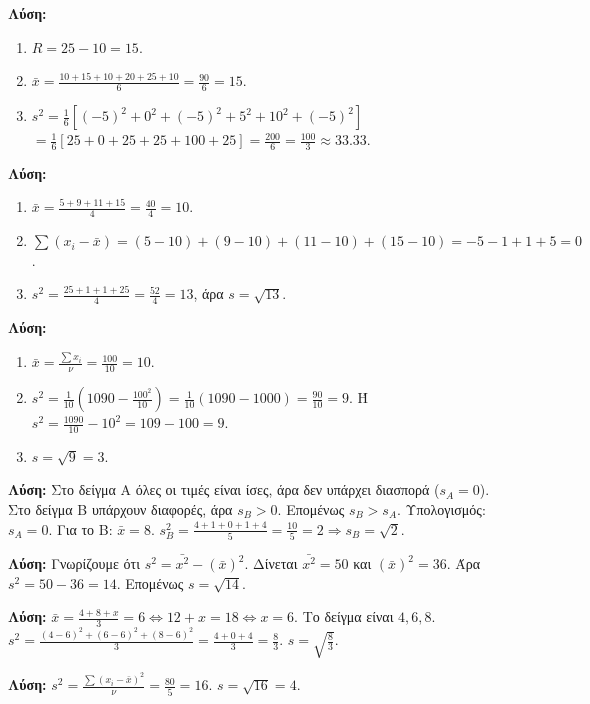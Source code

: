 \documentclass[11pt,a4paper,modern]{FFExercises}
\begin{document}
\askhsh
\textbf{Λύση:}
\begin{enumerate}
    \item $R = 25 - 10 = 15$.
    \item $\bar{x} = \frac{10+15+10+20+25+10}{6} = \frac{90}{6} = 15$.
    \item $s^2 = \frac{1}{6} [(-5)^2 + 0^2 + (-5)^2 + 5^2 + 10^2 + (-5)^2]$
    $= \frac{1}{6} [25 + 0 + 25 + 25 + 100 + 25] = \frac{200}{6} = \frac{100}{3} \approx 33.33$.
\end{enumerate}

\askhsh
\textbf{Λύση:}
\begin{enumerate}
    \item $\bar{x} = \frac{5+9+11+15}{4} = \frac{40}{4} = 10$.
    \item $\sum (x_i - \bar{x}) = (5-10) + (9-10) + (11-10) + (15-10) = -5 -1 + 1 + 5 = 0$.
    \item $s^2 = \frac{25+1+1+25}{4} = \frac{52}{4} = 13$, άρα $s=\sqrt{13}$.
\end{enumerate}

\askhsh
\textbf{Λύση:}
\begin{enumerate}
    \item $\bar{x} = \frac{\sum x_i}{\nu} = \frac{100}{10} = 10$.
    \item $s^2 = \frac{1}{10} (1090 - \frac{100^2}{10}) = \frac{1}{10} (1090 - 1000) = \frac{90}{10} = 9$.
    Ή $s^2 = \frac{1090}{10} - 10^2 = 109 - 100 = 9$.
    \item $s = \sqrt{9} = 3$.
\end{enumerate}

\askhsh
\textbf{Λύση:}
Στο δείγμα Α όλες οι τιμές είναι ίσες, άρα δεν υπάρχει διασπορά ($s_A=0$).
Στο δείγμα Β υπάρχουν διαφορές, άρα $s_B > 0$. Επομένως $s_B > s_A$.
Υπολογισμός: $s_A=0$. Για το Β: $\bar{x}=8$. $s_B^2 = \frac{4+1+0+1+4}{5} = \frac{10}{5} = 2 \Rightarrow s_B=\sqrt{2}$.

\askhsh
\textbf{Λύση:}
Γνωρίζουμε ότι $s^2 = \bar{x^2} - (\bar{x})^2$.
Δίνεται $\bar{x^2} = 50$ και $(\bar{x})^2 = 36$.
Άρα $s^2 = 50 - 36 = 14$.
Επομένως $s = \sqrt{14}$.

\askhsh
\textbf{Λύση:}
$\bar{x} = \frac{4+8+x}{3} = 6 \Leftrightarrow 12+x = 18 \Leftrightarrow x=6$.
Το δείγμα είναι $4, 6, 8$.
$s^2 = \frac{(4-6)^2 + (6-6)^2 + (8-6)^2}{3} = \frac{4+0+4}{3} = \frac{8}{3}$.
$s = \sqrt{\frac{8}{3}}$.

\askhsh
\textbf{Λύση:}
$s^2 = \frac{\sum (x_i - \bar{x})^2}{\nu} = \frac{80}{5} = 16$.
$s = \sqrt{16} = 4$.
\end{document}

